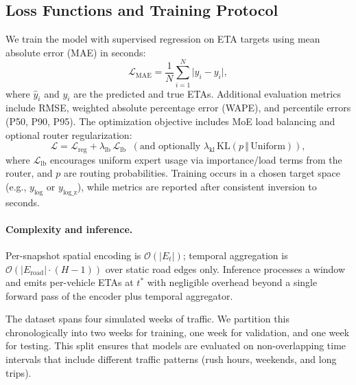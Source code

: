 \subsection{Loss Functions and Training Protocol}\label{sec:loss}
We train the model with supervised regression on ETA targets using mean absolute error (MAE) in seconds:
\[
\mathcal{L}_{\text{MAE}} = \frac{1}{N}\sum_{i=1}^N \big| \hat{y}_i - y_i \big|,
\]
where $\hat{y}_i$ and $y_i$ are the predicted and true ETAs. Additional evaluation metrics include RMSE, weighted absolute percentage error (WAPE), and percentile errors (P50, P90, P95). The optimization objective includes MoE load balancing and optional router regularization:
\[
\mathcal{L} = \mathcal{L}_{\text{reg}} + \lambda_{\text{lb}}\,\mathcal{L}_{\text{lb}} \;\; (\text{and optionally } 
\lambda_{\text{kl}}\,\mathrm{KL}(p\,\Vert\,\text{Uniform})),
\]
where $\mathcal{L}_{\text{lb}}$ encourages uniform expert usage via importance/load terms from the router, and $p$ are routing probabilities. Training occurs in a chosen target space (e.g., $y_{\text{log}}$ or $y_{\text{log\_z}}$), while metrics are reported after consistent inversion to seconds.

\paragraph{Complexity and inference.}
Per-snapshot spatial encoding is $\mathcal{O}(|E_t|)$; temporal aggregation is $\mathcal{O}(|E_\text{road}|\cdot(H{-}1))$ over static road edges only. Inference processes a window and emits per-vehicle ETAs at $t^*$ with negligible overhead beyond a single forward pass of the encoder plus temporal aggregator.

The dataset spans four simulated weeks of traffic. We partition this chronologically into two weeks for training, one week for validation, and one week for testing. This split ensures that models are evaluated on non-overlapping time intervals that include different traffic patterns (rush hours, weekends, and long trips).

